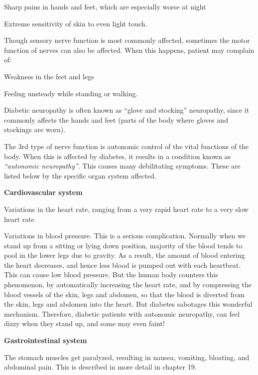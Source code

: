 { \item Sharp pains in hands and feet, which are especially worse at night

 \item Extreme sensitivity of skin to even light touch.

Though sensory nerve function is most commonly affected, sometimes the motor function of nerves can also be affected. When this happens, patient may complain of:

\item Weakness in the feet and legs

 \item Feeling unsteady while standing or walking.

Diabetic neuropathy is often known as “glove and stocking” neuropathy, since it commonly affects the hands and feet (parts of the body where gloves and stockings are worn).

The 3rd type of nerve function is autonomic control of the vital functions of the body. When this is affected by diabetes, it results in a condition known as \textit{“autonomic neuropathy”}. This causes many debilitating symptoms. These are listed below by the specific organ system affected.

\item \textbf{Cardiovascular system}
 \item Variations in the heart rate, ranging from a very rapid heart rate to a very slow heart rate

 \item Variations in blood pressure. This is a serious complication. Normally when we stand up from a sitting or lying down position, majority of the blood tends to pool in the lower legs due to gravity. As a result, the amount of blood entering the heart decreases, and hence less blood is pumped out with each heartbeat. This can cause low blood pressure. But the human body counters this phenomenon, by automatically increasing the heart rate, and by compressing the blood vessels of the skin, legs and abdomen, so that the blood is diverted from the skin, legs and abdomen into the heart. But diabetes sabotages this wonderful mechanism. Therefore, diabetic patients with autonomic neuropathy, can feel dizzy when they stand up, and some may even faint!


 \item \textbf{Gastrointestinal system}
 \item The stomach muscles get paralyzed, resulting in nausea, vomiting, bloating, and abdominal pain. This is described in more detail in chapter 19.

}
